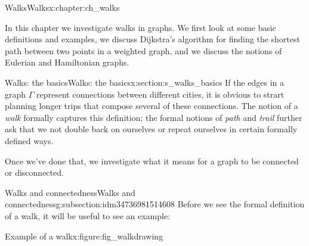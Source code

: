 \documentclass[oneside,10pt,]{book}
\numberwithin{equation}{section}
\begin{document}
\begin{chapterptx}{Walks}{}{Walks}{}{}{x:chapter:ch_walks}
\begin{introduction}{}%
In this chapter we investigate walks in graphs.  We first look at some basic definitions and examples, we discuss Dijkstra's algorithm for finding the shortest path between two points in a weighted graph, and we discuss the notions of Eulerian and Hamiltonian graphs.%
\end{introduction}%
%
%
\typeout{************************************************}
\typeout{************************************************}
%
\begin{sectionptx}{Walks: the basics}{}{Walks: the basics}{}{}{x:section:s_walks_basics}
If the edges in a graph \(\Gamma\) represent connections between different cities, it is obvious to strart planning longer trips that compose several of these connections.  The notion of a \emph{walk} formally captures this definition; the formal notions of \emph{path} and \emph{trail} further ask that we not double back on ourselves or repeat ourselves in certain formally defined ways.%
 \par
Once we've done that, we investigate what it means for a graph to be connected or disconnected.%
%
%
\typeout{************************************************}
\typeout{************************************************}
%
\begin{subsectionptx}{Walks and connectedness}{}{Walks and connectedness}{}{}{g:subsection:idm34736981514608}
Before we see the formal definition of a walk, it will be useful to see an example:%
\begin{figureptx}{Example of a walk}{x:figure:fig_walkdrawing}{}%
\begin{image}{0.15}{0.7}{0.15}%
\end{image}
\end{figureptx}
\end{subsectionptx}
\end{sectionptx}
\end{chapterptx}
\end{document}
